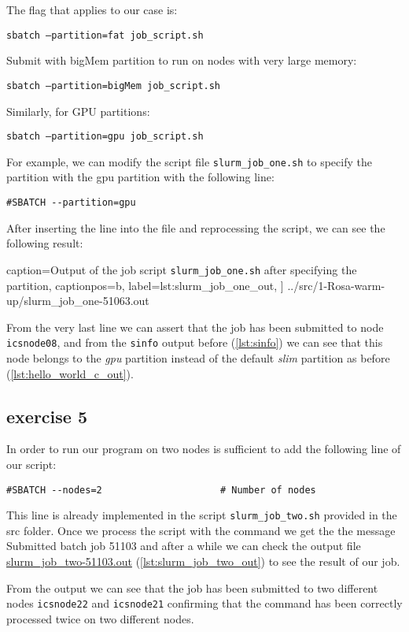The flag that applies to our case is:

\quad\quad\texttt{sbatch --partition=fat job\_script.sh}

Submit with bigMem partition to run on nodes with very large memory:

\quad\quad\texttt{sbatch --partition=bigMem job\_script.sh}

Similarly, for GPU partitions:

\quad\quad\texttt{sbatch --partition=gpu job\_script.sh}

For example, we can modify the script file \texttt{slurm\_job\_one.sh} to specify the partition with the gpu partition with the following line:
\begin{verbatim}
#SBATCH --partition=gpu
\end{verbatim}

After inserting the line into the file and reprocessing the script, we can see the following result:


    caption={Output of the job script \texttt{slurm\_job\_one.sh} after specifying the partition},
    captionpos=b,
    label={lst:slurm_job_one_out},
]
{../src/1-Rosa-warm-up/slurm_job_one-51063.out}

From the very last line we can assert that the job has been submitted to node \texttt{icsnode08}, and from the \texttt{sinfo} output before (\ref{lst:sinfo}) we can see that this node belongs to the \textit{gpu} partition instead of the default \textit{slim} partition as before (\ref{lst:hello_world_c_out}).

\subsection{exercise 5}

In order to run our program on two nodes is sufficient to add the following line of our script:
\begin{verbatim}
#SBATCH --nodes=2                     # Number of nodes
\end{verbatim}
This line is already implemented in the script \texttt{slurm\_job\_two.sh} provided in the src folder. Once we process the script with the command we get the the message Submitted batch job 51103 and after a while we can check the output file \href{../src/1-Rosa-warm-up/slurm\_job\_two-51103.out}{slurm\_job\_two-51103.out} (\ref{lst:slurm_job_two_out}) to see the result of our job.



From the output we can see that the job has been submitted to two different nodes \texttt{icsnode22} and \texttt{icsnode21} confirming that the command has been correctly processed twice on two different nodes.
